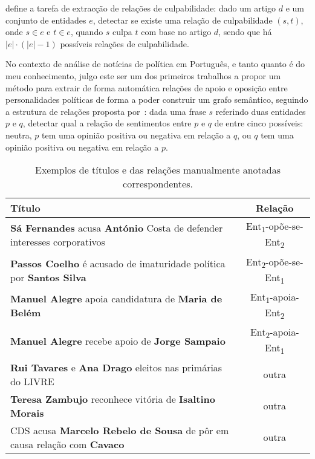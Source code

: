 \documentclass[a4paper, twocolumn, 11pt, twoside]{article}
\begin{document}
\cite{liang2019blames} define a tarefa de extracção de relações de culpabilidade: dado um artigo $d$ e um conjunto de entidades $e$, detectar se existe uma relação de culpabilidade $(s,t)$, onde $s \in e$ e $t \in e$, quando $s$ culpa $t$ com base no artigo $d$, sendo que há $|e| \cdot (|e| - 1)$ possíveis relações de culpabilidade.

No contexto de análise de notícias de política em Português, e tanto quanto é do meu conhecimento, julgo este ser um dos primeiros trabalhos a propor um método para extrair de forma automática relações de apoio e oposição entre personalidades políticas de forma a poder construir um grafo semântico, seguindo a estrutura de relações proposta por~\cite{park-etal-2021-blames}: dada uma frase $s$ referindo duas entidades $p$ e $q$, detectar qual a relação de sentimentos entre $p$ e $q$ de entre cinco possíveis: neutra, $p$ tem uma opinião positiva ou negativa em relação a $q$, ou $q$ tem uma opinião positiva ou negativa em relação a $p$.

\begin{table*}[!h]
  \centering
  \begin{tabular}{lc}
      {\bf Título} & {\bf Relação} \\
      \hline
	  \textbf{Sá Fernandes} acusa \textbf{António} Costa de defender interesses corporativos &	Ent\textsubscript{1}-opõe-se-Ent\textsubscript{2} \\
	  \textbf{Passos Coelho} é acusado de imaturidade política por \textbf{Santos Silva} &	Ent\textsubscript{2}-opõe-se-Ent\textsubscript{1}	\\
	  \textbf{Manuel Alegre} apoia candidatura de \textbf{Maria de Belém} &	Ent\textsubscript{1}-apoia-Ent\textsubscript{2}	\\
	  \textbf{Manuel Alegre} recebe apoio de \textbf{Jorge Sampaio} & Ent\textsubscript{2}-apoia-Ent\textsubscript{1}	\\
	  \textbf{Rui Tavares} e \textbf{Ana Drago} eleitos nas primárias do LIVRE & outra	\\
	  \textbf{Teresa Zambujo} reconhece vitória de \textbf{Isaltino Morais} & outra	\\
	  CDS acusa \textbf{Marcelo Rebelo de Sousa} de pôr em causa relação com \textbf{Cavaco} & outra \\
	  \hline
  \end{tabular}
  \caption{Exemplos de títulos e das relações manualmente anotadas correspondentes.}
  \label{tab:samples}
\end{table*}
\end{document}
